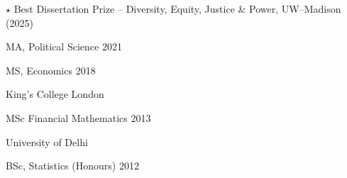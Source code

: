 \documentclass[10pt]{article}
\renewcommand{\section}[2]%
        {\pagebreak[3]\vspace{1.3\baselineskip}%
         \phantomsection\addcontentsline{toc}{section}{#1}%
         \hspace{0in}%
         \marginpar{
         \raggedright \scshape #1}#2}
\newcommand{\halfblankline}{\quad\vspace{-0.5\baselineskip}\pagebreak[3]}
\begin{document}
\quad \quad  $\star$ Best Dissertation Prize -- Diversity, Equity, Justice \& Power,  UW--Madison (2025)





\halfblankline

\quad MA, Political Science \hfill 2021

\halfblankline

\quad MS, Economics \hfill 2018

\halfblankline

King's College London

\quad MSc Financial Mathematics \hfill 2013


\halfblankline

University of Delhi

\quad BSc, Statistics (Honours) \hfill 2012




\end{document}
